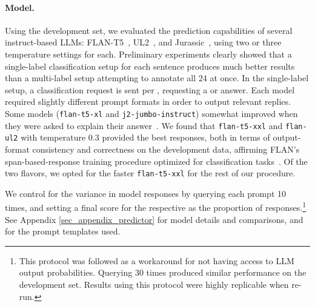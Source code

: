 \paragraph{Model.}
Using the development set, we evaluated the prediction capabilities of several instruct-based LLMs: FLAN-T5~\citep[\texttt{flan-t5-\{xl, xxl\}},][]{chung2022flan}, UL2~\citep[\texttt{flan-ul2},][]{tay2023ul2}, and Jurassic~\citep[\texttt{j2-jumbo-instruct},][]{ai212023jurassic}, using two or three temperature settings for each.
Preliminary experiments clearly showed that a single-label classification setup for each sentence \taxtype{} produces much better results than a multi-label setup attempting to annotate all 24 \taxtypes{} at once.
In the single-label setup, a classification request is sent per \taxtype{}, requesting a  or  answer.
Each model required slightly different prompt formats in order to output relevant replies. 
Some models (\texttt{flan-t5-xl} and \texttt{j2-jumbo-instruct}) somewhat improved when they were asked to explain their answer~\citep{wei2022chainofthought, liu2023prompt}.
We found that \texttt{flan-t5-xxl} and \texttt{flan-ul2} with temperature 0.3 provided the best responses, both in terms of output-format consistency and correctness on the development data, affirming FLAN's span-based-response training procedure optimized for classification tasks~\citep{wei2022flan}.
Of the two flavors, we opted for the faster \texttt{flan-t5-xxl} for the rest of our procedure.

We control for the variance in model responses by querying each prompt 10 times, and setting a final score for the respective \taxtype{} as the proportion of  responses.\footnote{This protocol was followed as a workaround for not having access to LLM output probabilities. Querying 30 times produced similar performance on the development set. Results using this protocol were highly replicable when re-run.}
See Appendix \ref{sec_appendix_predictor} for model details and comparisons, and for the prompt templates used.

